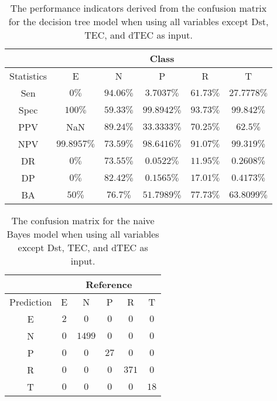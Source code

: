 \begin{table}[!ht]
	\centering
	\begin{tabular}{|c|c|c|c|c|c|}
		\hline
		 & \multicolumn{5}{c|}{Class} \\ \hline
		Statistics & E & N & P & R & T \\ \hline
		Sen & $0\%$ & $94.06\%$ & $3.7037\%$ & $61.73\%$ & $27.7778\%$ \\ \hline
		Spec & $100\%$ & $59.33\%$ & $99.8942\%$ & $93.73\%$ & $99.842\%$ \\ \hline
		PPV & NaN & $89.24\%$ & $33.3333\%$ & $70.25\%$ & $62.5\%$ \\ \hline
		NPV & $99.8957\%$ & $73.59\%$ & $98.6416\%$ & $91.07\%$ & $99.319\%$ \\ \hline
		DR & $0\%$ & $73.55\%$ & $0.0522\%$ & $11.95\%$ & $0.2608\%$ \\ \hline
		DP & $0\%$ & $82.42\%$ & $0.1565\%$ & $17.01\%$ & $0.4173\%$ \\ \hline
		BA & $50\%$ & $76.7\%$ & $51.7989\%$ & $77.73\%$ & $63.8099\%$ \\ \hline
	\end{tabular}
	\caption{The performance indicators derived from the confusion matrix for the decision tree model when using all variables except Dst, TEC, and dTEC as input.}
	\label{tab:cs:reverse:noTEC:C5.0}
\end{table}

\begin{table}[!ht]
	\centering
	\begin{tabular}{|c|c|c|c|c|c|}
		\hline
		 & \multicolumn{5}{|c|}{Reference} \\ \hline
		 Prediction & E & N & P & R & T \\ \hline
		 E & $2$ & $0$ & $0$ & $0$ & $0$ \\ \hline
		 N & $0$ & $1499$ & $0$ & $0$ & $0$ \\ \hline
		 P & $0$ & $0$ & $27$ & $0$ & $0$ \\ \hline
		 R & $0$ & $0$ & $0$ & $371$ & $0$ \\ \hline
		 T & $0$ & $0$ & $0$ & $0$ & $18$ \\ \hline
	\end{tabular}
	\caption{The confusion matrix for the naive Bayes model when using all variables except Dst, TEC, and dTEC as input.}
	\label{tab:cm:noTEC:nb}
\end{table}


